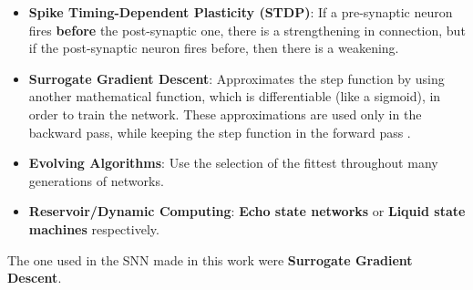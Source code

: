 		\begin{itemize}
			\item \textbf{Spike Timing-Dependent Plasticity (STDP)}: If a pre-synaptic neuron fires \textbf{before} the post-synaptic one, there is a strengthening in connection, but if the post-synaptic neuron fires before, then there is a weakening.
			\item \textbf{Surrogate Gradient Descent}: Approximates the step function by using another mathematical function, which is differentiable (like a sigmoid), in order to train the network. These approximations are used only in the backward pass, while keeping the step function in the forward pass \cite{kasabov2019time}.
			\item \textbf{Evolving Algorithms}: Use the selection of the fittest throughout many generations of networks.
			\item \textbf{Reservoir/Dynamic Computing}: \textbf{Echo state networks} or \textbf{Liquid state machines} respectively.
		\end{itemize}
	
		\par The one used in the SNN made in this work were \textbf{Surrogate Gradient Descent}.

			
			
			
			
			
			
			
			
			
			
			
			
			
			




